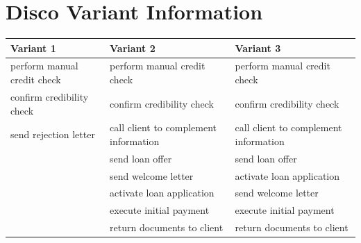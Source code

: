 \documentclass[a4paper]{article} %
\begin{document}
\newpage
\appendixpage
\appendix
\section{Disco Variant Information}
\begin{table}[htbp]
  \centering
  
    \begin{tabular}{|r|l|l|}
    \hline
    \multicolumn{1}{|l|}{Variant 1} & Variant 2 & Variant 3 \bigstrut\\
    \hline
    \multicolumn{1}{|l|}{perform manual credit check} & perform manual credit check & perform manual credit check \bigstrut\\
    \hline
    \multicolumn{1}{|l|}{confirm credibility check} & confirm credibility check & confirm credibility check \bigstrut\\
    \hline
    \multicolumn{1}{|l|}{send rejection letter} & call client to complement information & call client to complement information \bigstrut\\
    \hline
          & send loan offer & send loan offer \bigstrut\\
    \hline
          & send welcome letter & activate loan application \bigstrut\\
    \hline
          & activate loan application & send welcome letter \bigstrut\\
    \hline
          & execute initial payment & execute initial payment \bigstrut\\
    \hline
          & return documents to client & return documents to client \bigstrut\\
    \hline
    \end{tabular}%
  \label{tab:addlabel}%
\end{table}%



\end{document}
